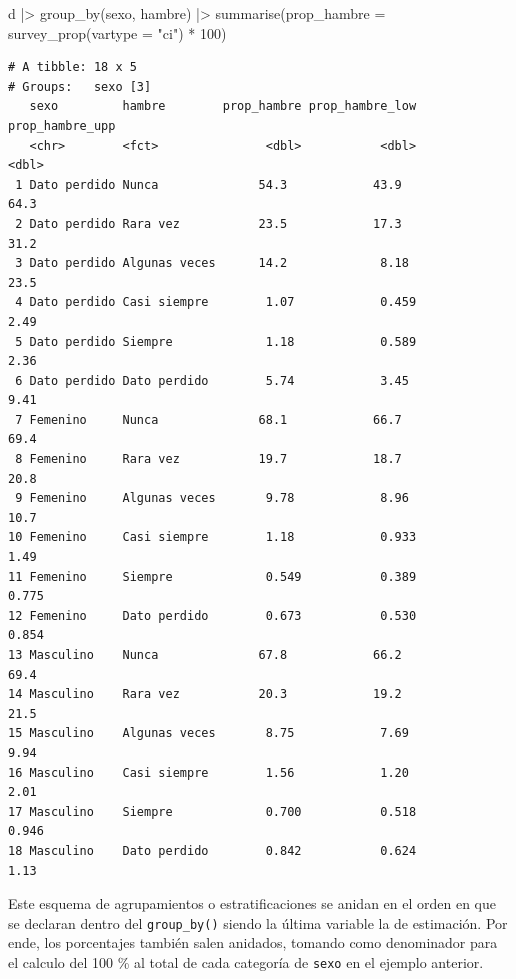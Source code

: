 \documentclass[
  spanish,
  a4paper,
]{scrbook}
\newenvironment{Shaded}{\begin{snugshade}}{\end{snugshade}}
\newcommand{\AttributeTok}[1]{\textcolor[rgb]{0.40,0.45,0.13}{#1}}
\newcommand{\DecValTok}[1]{\textcolor[rgb]{0.68,0.00,0.00}{#1}}
\newcommand{\FunctionTok}[1]{\textcolor[rgb]{0.28,0.35,0.67}{#1}}
\newcommand{\NormalTok}[1]{\textcolor[rgb]{0.00,0.23,0.31}{#1}}
\newcommand{\SpecialCharTok}[1]{\textcolor[rgb]{0.37,0.37,0.37}{#1}}
\newcommand{\StringTok}[1]{\textcolor[rgb]{0.13,0.47,0.30}{#1}}
\begin{document}
\begin{Shaded}
\begin{Highlighting}[]
\NormalTok{d }\SpecialCharTok{|\textgreater{}}
  \FunctionTok{group\_by}\NormalTok{(sexo, hambre) }\SpecialCharTok{|\textgreater{}}
  \FunctionTok{summarise}\NormalTok{(}\AttributeTok{prop\_hambre =} \FunctionTok{survey\_prop}\NormalTok{(}\AttributeTok{vartype =} \StringTok{"ci"}\NormalTok{) }\SpecialCharTok{*} \DecValTok{100}\NormalTok{)}
\end{Highlighting}
\end{Shaded}

\begin{verbatim}
# A tibble: 18 x 5
# Groups:   sexo [3]
   sexo         hambre        prop_hambre prop_hambre_low prop_hambre_upp
   <chr>        <fct>               <dbl>           <dbl>           <dbl>
 1 Dato perdido Nunca              54.3            43.9            64.3  
 2 Dato perdido Rara vez           23.5            17.3            31.2  
 3 Dato perdido Algunas veces      14.2             8.18           23.5  
 4 Dato perdido Casi siempre        1.07            0.459           2.49 
 5 Dato perdido Siempre             1.18            0.589           2.36 
 6 Dato perdido Dato perdido        5.74            3.45            9.41 
 7 Femenino     Nunca              68.1            66.7            69.4  
 8 Femenino     Rara vez           19.7            18.7            20.8  
 9 Femenino     Algunas veces       9.78            8.96           10.7  
10 Femenino     Casi siempre        1.18            0.933           1.49 
11 Femenino     Siempre             0.549           0.389           0.775
12 Femenino     Dato perdido        0.673           0.530           0.854
13 Masculino    Nunca              67.8            66.2            69.4  
14 Masculino    Rara vez           20.3            19.2            21.5  
15 Masculino    Algunas veces       8.75            7.69            9.94 
16 Masculino    Casi siempre        1.56            1.20            2.01 
17 Masculino    Siempre             0.700           0.518           0.946
18 Masculino    Dato perdido        0.842           0.624           1.13 
\end{verbatim}

Este esquema de agrupamientos o estratificaciones se anidan en el orden
en que se declaran dentro del \texttt{group\_by()} siendo la última
variable la de estimación. Por ende, los porcentajes también salen
anidados, tomando como denominador para el calculo del 100 \% al total
de cada categoría de \texttt{sexo} en el ejemplo anterior.
\end{document}
